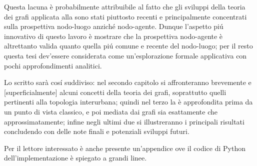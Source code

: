     Questa lacuna è probabilmente attribuibile al fatto che gli sviluppi della teoria dei grafi applicata alla \TCSMA{} sono stati piuttosto recenti e principalmente concentrati sulla prospettiva nodo-luogo anziché nodo-agente. Dunque l'aspetto piú innovativo di questo lavoro è mostrare che la prospettiva nodo-agente è altrettanto valida quanto quella piú comune e recente del nodo-luogo; per il resto questa tesi dev'essere considerata come un'esplorazione formale applicativa con pochi approfondimenti analitici.

    Lo scritto sarà cosí suddiviso: nel secondo capitolo si affronteranno brevemente e [superficialmente] alcuni concetti della teoria dei grafi, soprattutto quelli pertinenti alla topologia interurbana; quindi nel terzo la \TCSMA{} è approfondita prima da un punto di vista classico, e poi mediata dai grafi sia esattamente che approssimatamente; infine negli ultimi due si illustreranno i principali risultati concludendo con delle note finali e potenziali sviluppi futuri.
    
    Per il lettore interessato è anche presente un'appendice ove il codice di Python dell'implementazione è spiegato a grandi linee.